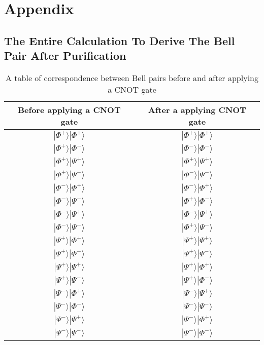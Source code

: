 \appendix
\chapter{Appendix}


\section{The Entire Calculation To Derive The Bell Pair After Purification}
\label{appendix:purification}

\begin{table}[ht]
  \begin{center}
    \begin{tabular}{|c|c|} \hline
      Before applying a CNOT gate & After a applying CNOT gate \\ \hline \cline{1-2}
      $|\Phi^+\rangle|\Phi^+\rangle$ &  $|\Phi^+\rangle|\Phi^+\rangle$ \\ \cline{1-2}
      $|\Phi^+\rangle|\Phi^-\rangle$ &  $|\Phi^-\rangle|\Phi^-\rangle$ \\ \cline{1-2}
      $|\Phi^+\rangle|\Psi^+\rangle$ &  $|\Phi^+\rangle|\Psi^+\rangle$ \\ \cline{1-2}
      $|\Phi^+\rangle|\Psi^-\rangle$ &  $|\Phi^-\rangle|\Psi^-\rangle$ \\ \cline{1-2}
      $|\Phi^-\rangle|\Phi^+\rangle$ &  $|\Phi^-\rangle|\Phi^+\rangle$ \\ \cline{1-2}
      $|\Phi^-\rangle|\Psi^-\rangle$ &  $|\Phi^+\rangle|\Phi^-\rangle$ \\ \cline{1-2}
      $|\Phi^-\rangle|\Psi^+\rangle$ &  $|\Phi^-\rangle|\Psi^+\rangle$ \\ \cline{1-2}
      $|\Phi^-\rangle|\Psi^-\rangle$ &  $|\Phi^+\rangle|\Psi^-\rangle$ \\ \cline{1-2}
      $|\Psi^+\rangle|\Phi^+\rangle$ &  $|\Psi^+\rangle|\Psi^+\rangle$ \\ \cline{1-2}
      $|\Psi^+\rangle|\Phi^-\rangle$ &  $|\Psi^+\rangle|\Psi^-\rangle$ \\ \cline{1-2}
      $|\Psi^+\rangle|\Psi^+\rangle$ &  $|\Psi^+\rangle|\Phi^+\rangle$ \\ \cline{1-2}
      $|\Psi^+\rangle|\Psi^-\rangle$ &  $|\Psi^+\rangle|\Phi^-\rangle$ \\ \cline{1-2}
      $|\Psi^-\rangle|\Phi^+\rangle$ &  $|\Psi^-\rangle|\Psi^+\rangle$ \\ \cline{1-2}
      $|\Psi^-\rangle|\Phi^-\rangle$ &  $|\Psi^-\rangle|\Psi^-\rangle$ \\ \cline{1-2}
      $|\Psi^-\rangle|\Psi^+\rangle$ &  $|\Psi^-\rangle|\Phi^+\rangle$ \\ \cline{1-2}
      $|\Psi^-\rangle|\Psi^-\rangle$ &  $|\Psi^-\rangle|\Phi^-\rangle$ \\ \cline{1-2}
    \end{tabular}
    \caption{A table of correspondence between Bell pairs before and after applying a CNOT gate}
  \end{center}
\end{table}

